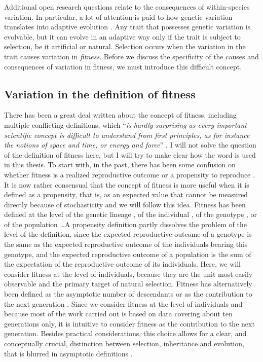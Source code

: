Additional open research questions relate to the consequences of within-species variation. In particular, a lot of attention is paid to how genetic variation translates into adaptive evolution \parencite{Brookfield2016}.
Any trait that possesses genetic variation is evolvable, but it can evolve in an adaptive way only if the trait is subject to selection, be it artificial or natural. Selection occurs when the variation in the trait causes variation in \emph{fitness}. Before we discuss the specificity of the causes and consequences of variation in fitness, we must introduce this difficult concept.

\subsection{Variation in the definition of fitness}
There has been a great deal written about the concept of fitness, including multiple conflicting definitions, which ``\emph{is hardly surprising as every important scientific concept is difficult to understand from first principles, as for instance the notions of space and time, or energy and force}'' \parencite[p. 1358][]{Wagner2010}. I will not solve the question of the definition of fitness here, but I will try to make clear how the word is used in this thesis. To start with, in the past, there has been some confusion on whether fitness is a realized reproductive outcome or a propensity to reproduce \parencite{Brandon1984}. It is now rather consensual that the concept of fitness is more useful when it is defined as a propensity, that is, as an expected value that cannot be measured directly because of stochasticity \parencite{Brandon1984,Price1996,Krimbas2004} and we will follow this idea. Fitness has been defined at the level of the genetic lineage \parencite[e.g.][]{Akc2016}, of the individual \parencite[e.g.][]{Cam2000}, of the genotype \parencite[e.g.][]{Steiner2012}, or of the population \parencite[e.g.][]{vanTienderen2000}\dots A propensity definition partly dissolves the problem of the level of the definition, since the expected reproductive outcome of a genotype is the same as the expected reproductive outcome of the individuals bearing this genotype, and the expected reproductive outcome of a population is the sum of the expectation of the reproductive outcome of its individuals. Here, we will consider fitness at the level of individuals, because they are the unit most easily observable and the primary target of natural selection.
Fitness has alternatively been defined as the asymptotic number of descendants or as the contribution to the next generation \parencite{Wade2006}. Since we consider fitness at the level of individuals and because most of the work carried out is based on data covering about ten generations only, it is intuitive to consider fitness as the contribution to the next generation. Besides practical considerations, this choice allows for a clear, and conceptually crucial, distinction between selection, inheritance and evolution, that is blurred in asymptotic definitions \parencite{Fisher1930, Arnold1984}. 
